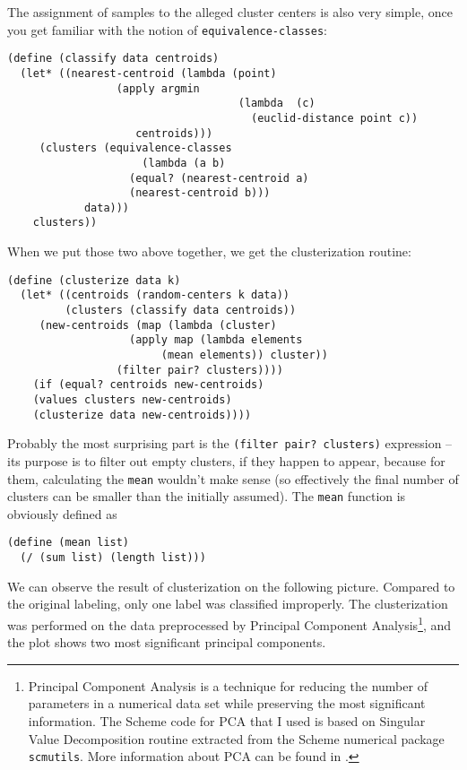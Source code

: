 The assignment of samples to the alleged cluster centers
is also very simple, once you get familiar with the notion
of \texttt{equivalence-classes}:

\begin{Verbatim}[samepage=true]
(define (classify data centroids)
  (let* ((nearest-centroid (lambda (point)
			     (apply argmin 
                                    (lambda  (c) 
                                      (euclid-distance point c))
				    centroids)))
	 (clusters (equivalence-classes 
                     (lambda (a b)
	               (equal? (nearest-centroid a)
			       (nearest-centroid b)))
		    data)))
    clusters))
\end{Verbatim}

When we put those two above together, we get the
clusterization routine:

\begin{Verbatim}[samepage=true]
(define (clusterize data k)
  (let* ((centroids (random-centers k data))
         (clusters (classify data centroids))
	 (new-centroids (map (lambda (cluster)
			       (apply map (lambda elements 
					    (mean elements)) cluster))
			     (filter pair? clusters))))
    (if (equal? centroids new-centroids)
	(values clusters new-centroids)
	(clusterize data new-centroids))))
\end{Verbatim}

Probably the most surprising part is the 
\texttt{(filter pair? clusters)} expression -- its purpose
is to filter out empty clusters, if they happen to appear,
because for them, calculating the \texttt{mean} wouldn't make
sense (so effectively the final number of clusters can be
smaller than the initially assumed). The \texttt{mean} function
is obviously defined as

\begin{Verbatim}[samepage=true]
(define (mean list)
  (/ (sum list) (length list)))
\end{Verbatim}

We can observe the result of clusterization on the following
picture. Compared to the original labeling, only one label
was classified improperly. The clusterization was performed
on the data preprocessed by Principal Component Analysis\footnote{
Principal Component Analysis is a technique for reducing
the number of parameters in a numerical data set while preserving
the most significant information. The Scheme code for PCA
that I used is based on Singular Value Decomposition routine
extracted from the Scheme numerical package \texttt{scmutils}.
More information about PCA can be found in \cite{Shlens2003}.
}, and the plot shows two most significant principal components.


